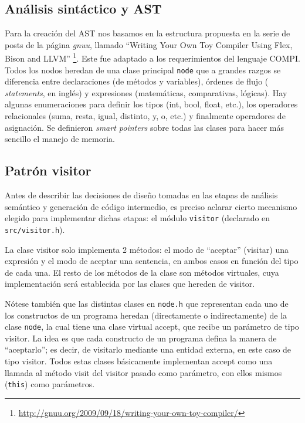 \documentclass[12pt, a4paper, titlepage]{article}
\begin{document}
  \subsection{Análisis sintáctico y AST}

  Para la creación del AST nos basamos en la estructura propuesta en la serie de
  posts de la página {\em gnuu}, llamado ``Writing Your Own Toy Compiler Using
  Flex, Bison and LLVM''
  \footnote{\url{http://gnuu.org/2009/09/18/writing-your-own-toy-compiler/}}.
  Este fue adaptado a los requerimientos del lenguaje COMPI. Todos los nodos
  heredan de una clase principal {\tt node} que a grandes razgos se diferencia
  entre declaraciones (de métodos y variables), órdenes de flujo ({\em
  statements}, en inglés) y expresiones (matemáticas, comparativas, lógicas).
  Hay algunas enumeraciones para definir los tipos (int, bool, float, etc.), los
  operadores relacionales (suma, resta, igual, distinto, y, o, etc.) y
  finalmente operadores de asignación. Se definieron {\em smart pointers} sobre
  todas las clases para hacer más sencillo el manejo de memoria.

  \subsection{Patrón visitor}

  Antes de describir las decisiones de diseño tomadas en las etapas de  análisis
  semántico y generación de código intermedio, es preciso aclarar cierto
  mecanismo elegido para implementar dichas etapas: el módulo {\tt visitor} (declarado
  en {\tt src/visitor.h}).

	La clase visitor solo implementa 2 métodos: el modo de ``aceptar'' (visitar)
	una expresión y el modo de aceptar una sentencia, en ambos casos en función
	del tipo de cada una. El resto de los métodos de la clase son métodos
	virtuales, cuya implementación será establecida por las clases que hereden de
	visitor.

	Nótese también que las distintas clases en {\tt node.h} que representan cada
	uno de los constructos de un programa heredan (directamente o indirectamente)
	de la clase {\tt node}, la cual tiene una clase virtual accept, que recibe un
	parámetro de tipo visitor. La idea es que cada constructo de un programa
	defina la manera de ``aceptarlo''; es decir, de visitarlo mediante una entidad
	externa, en este caso de tipo visitor. Todos estas clases básicamente
	implementan accept como una llamada al método visit del visitor pasado como
	parámetro, con ellos mismos ({\tt *this}) como parámetros.
\end{document}
